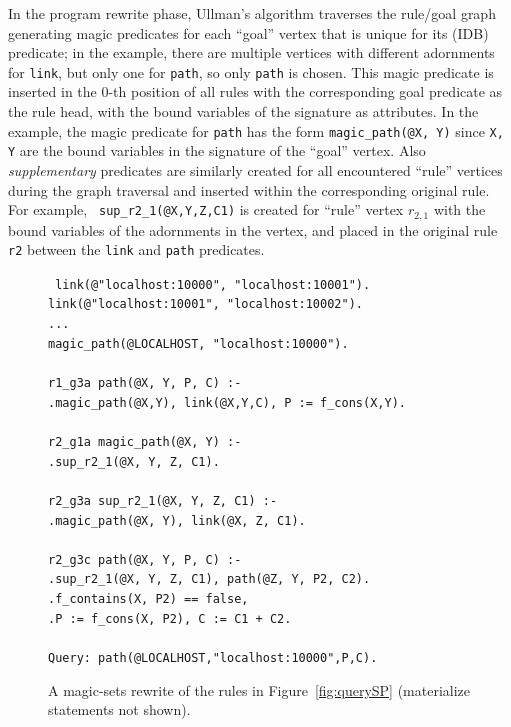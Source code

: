 \documentclass{sigmod08}
\newcommand{\datalogspace}{\textcolor[gray]{1}{.}\hspace{0.5in}}
\newcommand{\ol}[1]{\texttt{\small #1}\xspace}
\begin{document}
In the program rewrite phase, Ullman's algorithm traverses the rule/goal
  graph generating magic predicates for each ``goal'' vertex that is
  unique for its (IDB) predicate; in the example, there are multiple vertices
  with different adornments for \ol{link}, but only one for \ol{path},
  so only \ol{path} is chosen.  This magic predicate is inserted in
  the $0$-th position of all rules with the corresponding goal predicate
  as the rule head, with the bound variables of the signature as
  attributes. In the example, the magic predicate for \ol{path} has the
  form \ol{magic\_path(@X, Y)} since \ol{X, Y} are the bound
  variables in the signature of the ``goal'' vertex.  Also
  \emph{supplementary} predicates are similarly created for all
  encountered ``rule'' vertices during the graph traversal and inserted
  within the corresponding original rule.  For example, {\tt
  sup\_r2\_1(@X,Y,Z,C1)} 
  is created for ``rule'' vertex $r_{2,1}$ with the bound variables of
  the adornments in the vertex, and placed in the original rule \ol{r2}
  between the \ol{link} and \ol{path} predicates.


\begin{figure}[!t]
\begin{boxedminipage}{\linewidth}
\scriptsize{\tt
link(@"localhost:10000", "localhost:10001").\\
link(@"localhost:10001", "localhost:10002").\\
...\\
magic\_path(@LOCALHOST, "localhost:10000"). \\
\\
r1\_g3a path(@X, Y, P, C) :- \\
\datalogspace magic\_path(@X,Y), link(@X,Y,C), P := f\_cons(X,Y).\\
\\
r2\_g1a magic\_path(@X, Y) :- \\
\datalogspace sup\_r2\_1(@X, Y, Z, C1). \\
\\
r2\_g3a sup\_r2\_1(@X, Y, Z, C1) :- \\
\datalogspace magic\_path(@X, Y), link(@X, Z, C1). \\
\\
r2\_g3c path(@X, Y, P, C) :- \\
\datalogspace sup\_r2\_1(@X, Y, Z, C1), path(@Z, Y, P2, C2). \\
\datalogspace f\_contains(X, P2) == false, \\
\datalogspace P := f\_cons(X, P2), C := C1 + C2. \\
\\
Query: path(@LOCALHOST,"localhost:10000",P,C).
}
\caption{\label{fig:magicSP}A magic-sets rewrite of
      the rules in Figure~\ref{fig:querySP} (materialize statements not shown).}
\end{boxedminipage}
\end{figure}
\end{document}
